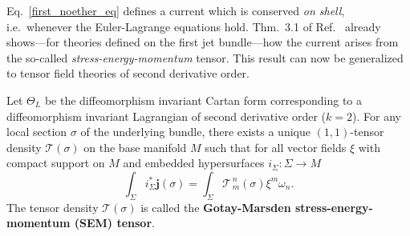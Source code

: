 Eq.~\ref{first_noether_eq} defines a current which is conserved \emph{on shell}, i.e.~whenever the Euler-Lagrange equations hold. Thm.~3.1 of Ref.~\cite{Gotay_1992} already shows---for theories defined on the first jet bundle---how the current arises from the so-called \emph{stress-energy-momentum} tensor. This result can now be generalized to tensor field theories of second derivative order.
\begin{theorem}\label{sem_thm}
  Let $\Theta_L$ be the diffeomorphism invariant Cartan form corresponding to a diffeomorphism invariant Lagrangian of second derivative order ($k=2$). For any local section $\sigma$ of the underlying bundle, there exists a unique $(1,1)$-tensor density $\mathcal T(\sigma)$ on the base manifold $M$ such that for all vector fields $\xi$ with compact support on $M$ and embedded hypersurfaces $i_\Sigma \colon \Sigma \rightarrow M$
  \begin{equation}\label{sem_definition}
    \int_\Sigma i_\Sigma^\ast\boldsymbol{j}(\sigma) = \int_\Sigma \mathcal T^{\,n}_{\,m}(\sigma)\xi^m \omega_n.
  \end{equation}
  The tensor density $\mathcal T(\sigma)$ is called the \textbf{Gotay-Marsden stress-energy-momentum (SEM) tensor}.
\end{theorem}
